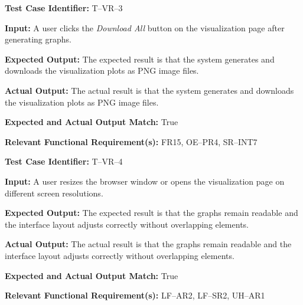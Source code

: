 \documentclass[12pt, titlepage]{article}
\begin{document}
\begin{mdframed}[linewidth=0.5mm]
\setlength{\parindent}{0pt}
\textbf{Test Case Identifier:} T--VR--3
\vspace{0.4em}

\textbf{Input:} A user clicks the \textit{Download All} button on the visualization page after generating graphs.
\vspace{0.4em}

\textbf{Expected Output:} The expected result is that the system generates and downloads the visualization plots as PNG image files.
\vspace{0.4em}

\textbf{Actual Output:} The actual result is that the system generates and downloads the visualization plots as PNG image files.
\vspace{0.4em}

\textbf{Expected and Actual Output Match:} True
\vspace{0.4em}

\textbf{Relevant Functional Requirement(s):} FR15, OE--PR4, SR--INT7
\end{mdframed}

\begin{mdframed}[linewidth=0.5mm]
\setlength{\parindent}{0pt}
\textbf{Test Case Identifier:} T--VR--4
\vspace{0.4em}

\textbf{Input:} A user resizes the browser window or opens the visualization page on different screen resolutions.
\vspace{0.4em}

\textbf{Expected Output:} The expected result is that the graphs remain readable and the interface layout adjusts correctly without overlapping elements.
\vspace{0.4em}

\textbf{Actual Output:} The actual result is that the graphs remain readable and the interface layout adjusts correctly without overlapping elements.
\vspace{0.4em}

\textbf{Expected and Actual Output Match:} True
\vspace{0.4em}

\textbf{Relevant Functional Requirement(s):} LF--AR2, LF--SR2, UH--AR1
\end{mdframed}
\end{document}

